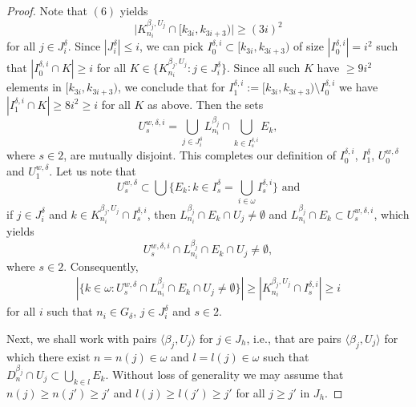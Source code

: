 \documentclass[12pt,a4paper]{amsart}
\theoremstyle{definition}
\newcommand{\w}{\omega}
\newcommand{\la}{\langle}
\newcommand{\ra}{\rangle}
\begin{document}
\begin{proof}
 Note that   $(6)$ 
  yields
 $$ \big|K^{\beta_j,U_j}_{n_i}\cap [k_{3i},k_{3i+3})\big|\geq (3i)^2   $$
 for all $j\in J^\delta_i$.
Since $|J^\delta_i|\leq i$,
we can pick $I^{\delta,i}_0\subset [k_{3i}, k_{3i+3})$
of size $|I^{\delta,i}_0|= i^2$ such that
$|I^{\delta,i}_0\cap K|\geq i $ for all
$K\in \big\{K^{\beta_j, U_j}_{n_i} : j\in J^{\delta}_i \big\}.$
Since all such $K$ have  $\geq 9i^2$ elements in $[k_{3i}, k_{3i+3})$,
we conclude that for  
 $I^{\delta,i}_1:=[k_{3i}, k_{3i+3})\setminus I^{\delta,i}_0$
 we have $|I^{\delta,i}_1\cap K|\geq 8i^2\geq i $ for all $K$ as above. 
 Then the sets
 $$
  U^{w,\delta,i}_s= \bigcup_{j\in J^{\delta}_i}L^{\beta_j}_{n_i} \cap \bigcup_{k\in I^{\delta,i}_s} E_k,    
 $$
 where $s\in 2$, are mutually disjoint. This completes our definition of 
$I^{\delta,i}_0$, $I^{\delta}_1$, $U^{w,\delta}_0$ and
$U^{w,\delta}_1$. Let us note that 
\begin{equation} \label{w0}
U^{w,\delta}_s\subset\bigcup\big\{E_k:k\in I^\delta_s=\bigcup_{i\in\w }I^{\delta,i}_s \big\}    \mbox{ \ and}
\end{equation}
if
{$j\in J^\delta_i$ and}
$k\in K^{\beta_j,U_j}_{n_i}\cap I^{\delta,i}_s$, then
$L^{\beta_j}_{n_i}\cap E_k\cap U_j\neq \emptyset$ and $L^{\beta_j}_{n_i}\cap E_k\subset U^{w,\delta,i}_s$, which yields
$$U^{w,\delta,i}_s\cap L^{\beta_j}_{n_i}\cap E_k\cap U_j\neq \emptyset,$$
where $s\in 2$.
Consequently, 
\begin{eqnarray}\label{w1}
|\{k\in\w: U^{w,\delta}_s\cap L^{\beta_j}_{n_i}\cap E_k\cap U_j\neq 
\emptyset \}|\geq |K^{\beta_j,U_j}_{n_i}\cap I^{\delta,i}_s|\geq i 
\end{eqnarray}
for all $i$ such that $n_i\in G_\delta$,  $j\in J^\delta_i$ and $s\in 2$.


Next, we shall work with pairs $\la \beta_j, U_j\ra$ for $j\in J_h$, i.e.,
that are pairs   $\la \beta_j, U_j\ra$ for which
there exist $n=n(j)\in\w$ and $l=l(j)\in\w$
such that $D^{\beta_j}_n\cap U_j\subset\bigcup_{k\in l}E_{k}$.
Without loss of generality we may assume that
$n(j)\geq n(j')\geq j'$ and  $l(j)\geq l(j')\geq j'$ for all
$j\geq j'$ in $J_h$.


\end{proof}
\end{document}
